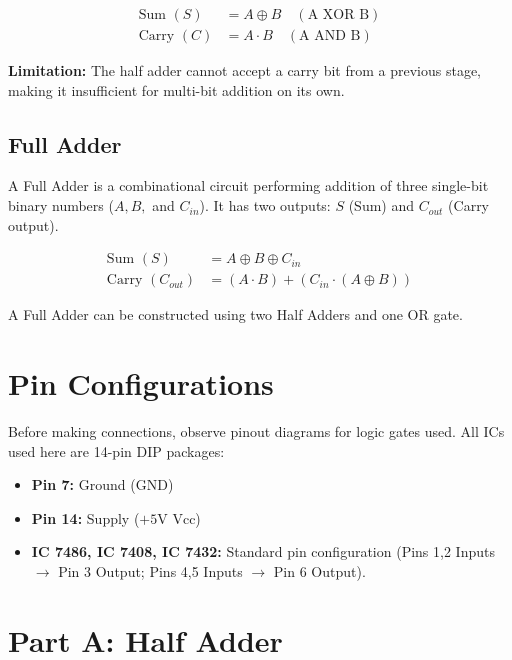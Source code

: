 \begin{keyequation}
\begin{align}
    \text{Sum } (S) &= A \oplus B \quad (\text{A XOR B}) \\
    \text{Carry } (C) &= A \cdot B \quad (\text{A AND B})
\end{align}
\end{keyequation}

\noindent \textbf{Limitation:} The half adder cannot accept a carry bit from a previous stage, making it insufficient for multi-bit addition on its own.

\subsection{Full Adder}
A Full Adder is a combinational circuit performing addition of three single-bit binary numbers ($A, B,$ and $C_{in}$). It has two outputs: $S$ (Sum) and $C_{out}$ (Carry output).

\begin{keyequation}
\begin{align}
    \text{Sum } (S) &= A \oplus B \oplus C_{in} \\
    \text{Carry } (C_{out}) &= (A \cdot B) + (C_{in} \cdot (A \oplus B))
\end{align}
\end{keyequation}

A Full Adder can be constructed using two Half Adders and one OR gate.

\section{Pin Configurations}

Before making connections, observe pinout diagrams for logic gates used. All ICs used here are 14-pin DIP packages:
\begin{itemize}
    \item \textbf{Pin 7:} Ground ($\text{GND}$)
    \item \textbf{Pin 14:} Supply ($+5\text{V Vcc}$)
    \item \textbf{IC 7486, IC 7408, IC 7432:} Standard pin configuration (Pins 1,2 Inputs $\to$ Pin 3 Output; Pins 4,5 Inputs $\to$ Pin 6 Output).
\end{itemize}

\section{Part A: Half Adder}


